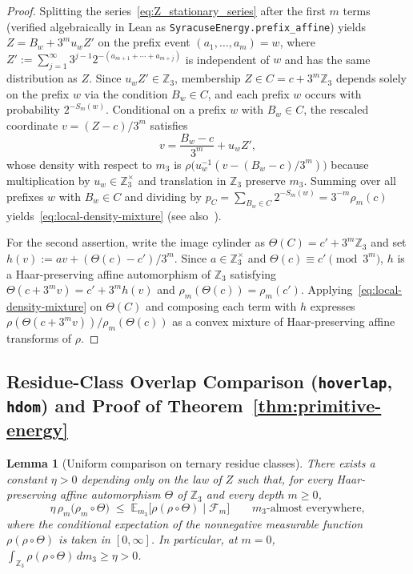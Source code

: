 \documentclass[11pt,a4paper]{article}
\numberwithin{equation}{section}
\newtheorem{lemma}[theorem]{Lemma}
\theoremstyle{definition}
\theoremstyle{remark}
\newcommand{\Z}{\mathbb{Z}}
\newcommand{\E}{\mathbb{E}}
\newcommand{\cF}{\mathcal{F}}
\begin{document}
\begin{proof}
Splitting the series~\eqref{eq:Z_stationary_series} after the first $m$ terms (verified algebraically in Lean as \texttt{SyracuseEnergy.prefix\_affine}) yields $Z = B_w + 3^m u_w Z'$ on the prefix event $(a_1, \dots, a_m) = w$, where $Z' := \sum_{j=1}^\infty 3^{j-1} 2^{-(a_{m+1} + \cdots + a_{m+j})}$ is independent of $w$ and has the same distribution as $Z$. Since $u_w Z' \in \Z_3$, membership $Z \in C = c + 3^m\Z_3$ depends solely on the prefix $w$ via the condition $B_w \in C$, and each prefix $w$ occurs with probability $2^{-S_m(w)}$. Conditional on a prefix $w$ with $B_w \in C$, the rescaled coordinate $v = (Z - c)/3^m$ satisfies
\[
 v = \frac{B_w - c}{3^m} + u_w Z',
\]
whose density with respect to $m_3$ is $\rho\bigl(u_w^{-1}(v - (B_w - c)/3^m)\bigr)$ because multiplication by $u_w \in \Z_3^\times$ and translation in $\Z_3$ preserve $m_3$. Summing over all prefixes $w$ with $B_w \in C$ and dividing by $p_C = \sum_{B_w \in C} 2^{-S_m(w)} = 3^{-m}\rho_m(c)$ yields~\eqref{eq:local-density-mixture} (see also~\cite{WeaverLocal2026}).

For the second assertion, write the image cylinder as $\Theta(C) = c' + 3^m\Z_3$ and set $h(v) := a v + (\Theta(c) - c')/3^m$. Since $a \in \Z_3^\times$ and $\Theta(c) \equiv c' \pmod{3^m}$, $h$ is a Haar-preserving affine automorphism of $\Z_3$ satisfying $\Theta(c + 3^m v) = c' + 3^m h(v)$ and $\rho_m(\Theta(c)) = \rho_m(c')$. Applying~\eqref{eq:local-density-mixture} on $\Theta(C)$ and composing each term with $h$ expresses $\rho(\Theta(c + 3^m v))/\rho_m(\Theta(c))$ as a convex mixture of Haar-preserving affine transforms of $\rho$.
\end{proof}

\subsection{Residue-Class Overlap Comparison (\texttt{hoverlap}, \texttt{hdom}) and Proof of Theorem~\ref{thm:primitive-energy}}\label{subsec:proof_thm_primitive}

\begin{lemma}[Uniform comparison on ternary residue classes]\label{lem:residue-overlap}
There exists a constant $\eta > 0$ depending only on the law of $Z$ such that, for every Haar-preserving affine automorphism $\Theta$ of $\Z_3$ and every depth $m \ge 0$,
\begin{equation}\label{eq:residue-overlap}
 \eta\,\rho_m\bigl(\rho_m \circ \Theta\bigr) \;\le\; \E_{m_3}\!\bigl[\rho(\rho \circ \Theta) \;\big|\; \cF_m\bigr] \qquad \text{$m_3$-almost everywhere},
\end{equation}
where the conditional expectation of the nonnegative measurable function $\rho(\rho \circ \Theta)$ is taken in $[0, \infty]$. In particular, at $m = 0$, $\int_{\Z_3} \rho(\rho \circ \Theta)\,dm_3 \ge \eta > 0$.
\end{lemma}
\end{document}
